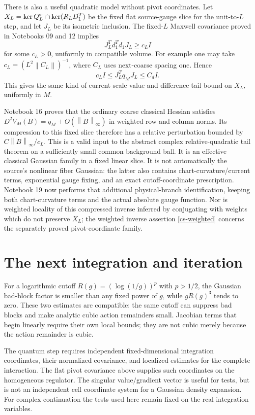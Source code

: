 \documentclass[11pt]{article}
\theoremstyle{remark}
\newcommand{\norm}[1]{\left\|#1\right\|}
\begin{document}
There is also a useful quadratic model without pivot coordinates.
Let $X_L=\ker Q_L^{\rm st}\cap\ker(R_LD_1^T)$ be the fixed flat
source-gauge slice for the unit-to-$L$ step, and let $J_L$ be its
isometric inclusion. The fixed-$L$ Maxwell covariance proved in
Notebooks 09 and 12 implies
\[
 J_L^Td_1^Td_1J_L\ge c_LI
\]
for some $c_L>0$, uniformly in compatible volume. For example one
may take $c_L=(L^2\norm{C_L})^{-1}$, where $C_L$ uses next-coarse
spacing one. Hence
\begin{equation}\label{cs-slice-gap}
 c_LI\le J_L^Tq_MJ_L\le C_dI.
\end{equation}
This gives the same kind of current-scale value-and-difference
tail bound on $X_L$, uniformly in $M$.

Notebook 16 proves that the ordinary coarse classical Hessian
satisfies $D^2V_M(B)=q_M+O(\norm B_\infty)$ in weighted row and
column norms. Its compression to this fixed slice therefore has a
relative perturbation bounded by $C\norm B_\infty/c_L$. This is
a valid input to the abstract complex relative-quadratic tail
theorem on a sufficiently small common background ball. It is an
effective classical Gaussian family in a fixed linear slice.
It is not automatically the source's nonlinear fiber Gaussian:
the latter also contains chart-curvature/current terms, exponential
gauge fixing, and an exact cutoff-coordinate prescription.
Notebook 19 now performs that additional physical-branch
identification, keeping both chart-curvature terms and the
actual absolute gauge function.
Nor is weighted locality of this compressed inverse inferred by
conjugating with weights which do not preserve $X_L$; the weighted
inverse assertion \eqref{cs-weighted} concerns the separately
proved pivot-coordinate family.

\section{The next integration and iteration}
\label{gs17-next}

For a logarithmic cutoff $R(g)=(\log(1/g))^p$ with $p>1/2$,
the Gaussian bad-block factor is smaller than any fixed power of
$g$, while $gR(g)^3$ tends to zero. These two estimates are
compatible: the same cutoff can suppress bad blocks and make
analytic cubic action remainders small. Jacobian terms that begin
linearly require their own local bounds; they are not cubic merely
because the action remainder is cubic.

The quantum step requires independent fixed-dimensional integration
coordinates, their normalized covariance, and localized estimates
for the complete interaction. The flat pivot covariance above
supplies such coordinates on the homogeneous regulator. The
singular value/gradient vector is useful for tests, but is not an
independent cell coordinate system for a Gaussian density expansion.
For complex continuation the tests used here remain fixed on the
real integration variables.
\end{document}
